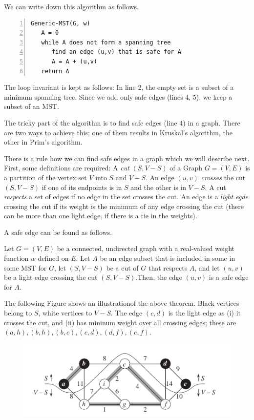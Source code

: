 We can write down this algorithm as follows.

\begin{Verbatim}[numbers=left, xleftmargin=5mm]
Generic-MST(G, w)
   A = 0
   while A does not form a spanning tree
      find an edge (u,v) that is safe for A
      A = A + (u,v)
   return A
\end{Verbatim}

The loop invariant is kept as follows: In line 2, the empty set is a subset of a minimum spanning tree. Since we add only safe edges (lines 4, 5), we keep a subset of an MST. 

The tricky part of the algorithm is to find safe edges (line 4) in a graph. There are two ways to achieve this; one of them results in Kruskal's algorithm, the other in Prim's algorithm.

There is a rule how we can find safe edges in a graph which we will describe next. First, some definitions are required: A \emph{cut} $(S,V-S)$ of a Graph $G = (V,E)$ is a partition of the vertex set $V$ into $S$ and $V-S$. An edge $(u,v)$ \emph{crosses} the cut $(S,V-S)$ if one of its endpoints is in $S$ and the other is in $V-S$. A cut \emph{respects} a set of edges if no edge in the set crosses the cut. An edge is a \emph{light egde} crossing the cut if its weight is the minimum of any edge crossing the cut (there can be more than one light edge, if there is a tie in the weights).

A safe edge can be found as follows.

\begin{theorem}
Let $G = (V,E)$ be a connected, undirected graph with a real-valued weight function $w$ defined on $E$. Let $A$ be an edge subset that is included in some in some MST for $G$, let $(S,V-S)$ be a cut of $G$ that respects $A$, and let $(u,v)$ be a light edge crossing the cut $(S,V-S)$.Then, the edge $(u,v)$ is a safe edge for $A$.
\end{theorem}

The following Figure shows an illustrationof the above theorem. Black vertices belong to $S$, white vertices to $V-S$. The edge $(c,d)$ is the light edge as (i) it crosses the cut, and (ii) has mininum weight over all crossing edges; these are $(a,h), (b,h), (b,c), (c,d), (d,f), (e,f)$. 

\begin{figure}[H]
\centering
\includegraphics[scale=0.7]{images/mst_1_3.png}
\end{figure}


